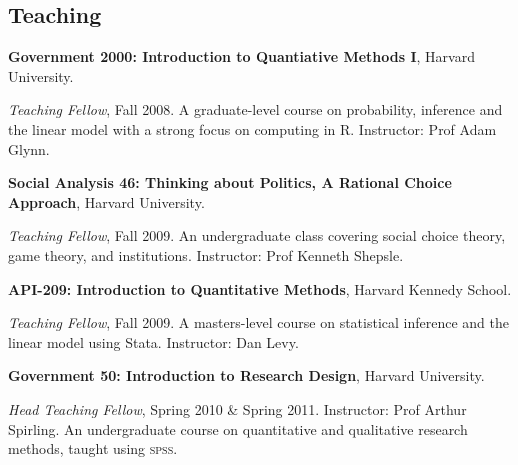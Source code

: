 \documentclass[margin,line]{res}
\newenvironment{list1}{
  \begin{list}{\ding{113}}{%
      \setlength{\itemsep}{0in}
      \setlength{\parsep}{0in} \setlength{\parskip}{0in}
      \setlength{\topsep}{0in} \setlength{\partopsep}{0in} 
      \setlength{\leftmargin}{0.17in}}}{\end{list}}
\begin{document}
\begin{resume}
\section{\textsf{\sc Teaching}}
{\bf Government 2000: Introduction to Quantiative Methods I}, Harvard
University.
\begin{list1} 
\item[] {\em Teaching Fellow}, Fall 2008. A graduate-level course on
probability, inference and the linear model with a strong focus on computing in
R. Instructor: Prof Adam Glynn.
\end{list1}
{\bf Social Analysis 46: Thinking about Politics, A Rational Choice Approach}, Harvard
University.
\begin{list1} 
\item[] {\em Teaching Fellow}, Fall 2009. An undergraduate class
  covering social choice theory, game theory, and
  institutions. Instructor: Prof Kenneth Shepsle.
\end{list1}
{\bf API-209: Introduction to Quantitative Methods}, Harvard
Kennedy School.
\begin{list1} 
\item[] {\em Teaching Fellow}, Fall 2009. A masters-level course on
  statistical inference and the linear model using
  Stata. Instructor: Dan Levy. 
\end{list1}
{\bf Government 50: Introduction to Research Design}, Harvard University.
\begin{list1} 
\item[] {\em Head Teaching Fellow}, Spring 2010 \& Spring 2011. Instructor: Prof
  Arthur Spirling. An undergraduate course on quantitative and
  qualitative research methods, taught using \textsc{spss}.
\end{list1}


\end{resume}
\end{document}
